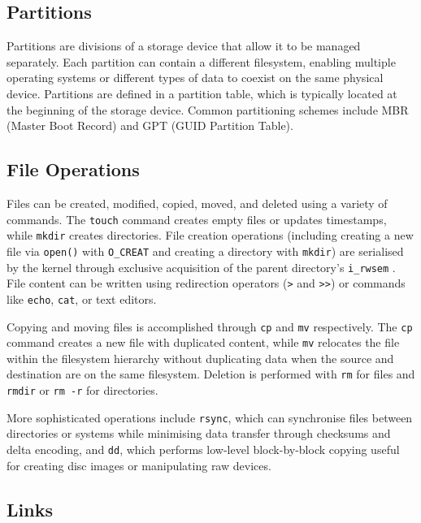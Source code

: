 \subsection{Partitions}
\label{Partitions}

Partitions are divisions of a storage device that allow it to be managed separately. Each partition can contain a different filesystem, enabling multiple operating systems or different types of data to coexist on the same physical device. Partitions are defined in a partition table, which is typically located at the beginning of the storage device. Common partitioning schemes include MBR (Master Boot Record) and GPT (GUID Partition Table).

\subsection{File Operations}
\label{FileOperations}

Files can be created, modified, copied, moved, and deleted using a variety of commands. The \texttt{touch} command creates empty files or updates timestamps, while \texttt{mkdir} creates directories. File creation operations (including creating a new file via \texttt{open()} with \texttt{O\_CREAT} and creating a directory with \texttt{mkdir}) are serialised by the kernel through exclusive acquisition of the parent directory's \texttt{i\_rwsem} \parencite{KernelFSLocking}. File content can be written using redirection operators (\texttt{>} and \texttt{>>}) or commands like \texttt{echo}, \texttt{cat}, or text editors.

Copying and moving files is accomplished through \texttt{cp} and \texttt{mv} respectively. The \texttt{cp} command creates a new file with duplicated content, while \texttt{mv} relocates the file within the filesystem hierarchy without duplicating data when the source and destination are on the same filesystem. Deletion is performed with \texttt{rm} for files and \texttt{rmdir} or \texttt{rm -r} for directories.

More sophisticated operations include \texttt{rsync}, which can synchronise files between directories or systems while minimising data transfer through checksums and delta encoding, and \texttt{dd}, which performs low-level block-by-block copying useful for creating disc images or manipulating raw devices.

\subsection{Links}
\label{Links}

